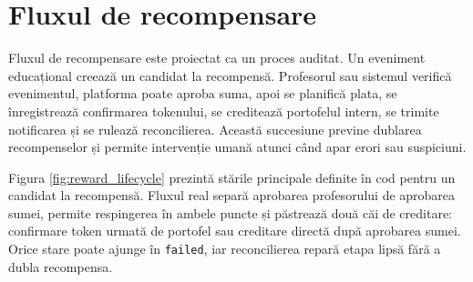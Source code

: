\section{Fluxul de recompensare}
Fluxul de recompensare este proiectat ca un proces auditat. Un eveniment educațional creează un candidat la recompensă. Profesorul sau sistemul verifică evenimentul, platforma poate aproba suma, apoi se planifică plata, se înregistrează confirmarea tokenului, se creditează portofelul intern, se trimite notificarea și se rulează reconcilierea. Această succesiune previne dublarea recompenselor și permite intervenție umană atunci când apar erori sau suspiciuni.

Figura \ref{fig:reward_lifecycle} prezintă stările principale definite în cod pentru un candidat la recompensă. Fluxul real separă aprobarea profesorului de aprobarea sumei, permite respingerea în ambele puncte și păstrează două căi de creditare: confirmare token urmată de portofel sau creditare directă după aprobarea sumei. Orice stare poate ajunge în \texttt{failed}, iar reconcilierea repară etapa lipsă fără a dubla recompensa.


